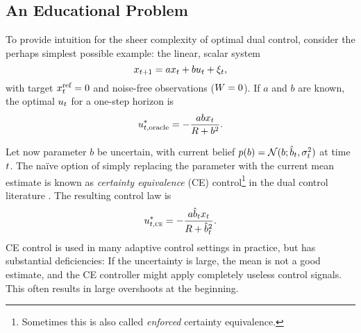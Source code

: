 \subsection{An Educational Problem}
\label{sec:toy-problem}
To provide intuition for the sheer complexity of optimal dual control, consider
the perhaps simplest possible example: the linear, scalar system
\begin{equation}
  \label{eq:toy-example}
  x_{\tk+1} = a x_\tk + b u_\tk + \dist_\tk,
\end{equation}
with target $x^\text{ref}_t=0$ and noise-free observations ($W=0$). If $a$ and $b$
are known, the optimal $u_t$ for a one-step horizon is
\begin{equation}
  u_{t,\text{oracle}}^* = -\frac{a b x_t}{R + b^2}.
\end{equation}

Let now parameter $b$ be uncertain, with current belief $p(b) = \mathcal{N}(b; \hat b_{t},
\sigma^2_{t})$ at time $t$. The na\"ive option of simply replacing the parameter with
the current mean estimate is known as \emph{certainty equivalence} (CE)
control\footnote{Sometimes this is also called \emph{enforced} certainty
equivalence.} in the dual control literature \cite{Bar-Shalom.Tse:1974:Dual}.
The resulting control law is
\begin{equation}
  u_{t,{\normalfont\textsc{ce}}}^* = -\frac{a\hat b_{t} x_t}{R + \hat b_{t}^2}.
\end{equation}
CE control is used in many adaptive control settings in practice, but has
substantial
deficiencies: If the uncertainty is large, the mean is not a good estimate, and
the CE controller might apply completely useless control signals. This often
results in large overshoots at the beginning.

